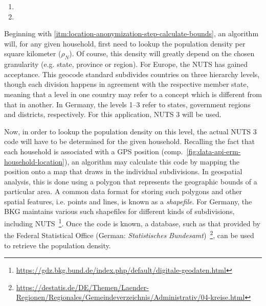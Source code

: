 \begin{enumerate}[label=(\Alph*)]
  \item {}
  \item {}
\end{enumerate}

Beginning with \ref{itm:location-anonymization-step-calculate-bounds}, an algorithm will, for any given household, first need to lookup the population density per square kilometer ($\rho_N$). Of course, this density will greatly depend on the chosen granularity (e.g. state, province or region). For Europe, the \ac{NUTS} has gained acceptance. This geocode standard subdivides countries on three hierarchy levels, though each division happens in agreement with the respective member state, meaning that a level in one country may refer to a concept which is different from that in another. In Germany, the levels 1--3 refer to states, government regions and districts, respectively. For this application, \ac{NUTS} 3 will be used.

Now, in order to lookup the population density on this level, the actual \acs{NUTS} 3 code will have to be determined for the given household. Recalling the fact that each household is associated with a \ac{GPS} position (comp.~\autoref{fig:data-api-erm-household-location}), an algorithm may calculate this code by mapping the position onto a map that draws in the individual subdivisions. In geospatial analysis, this is done using a polygon that represents the geographic bounds of a particular area. A common data format for storing such polygons and other spatial features, i.e. points and lines, is known as a \textit{shapefile}. For Germany, the \acl*{BKG} maintains various such shapefiles for different kinds of subdivisions, including \acs{NUTS}~\footnote{\url{https://gdz.bkg.bund.de/index.php/default/digitale-geodaten.html}}. Once the code is known, a database, such as that provided by the Federal Statistical Office (German: \textit{Statistisches Bundesamt})~\footnote{\url{https://destatis.de/DE/Themen/Laender-Regionen/Regionales/Gemeindeverzeichnis/Administrativ/04-kreise.html}}, can be used to retrieve the population density.

